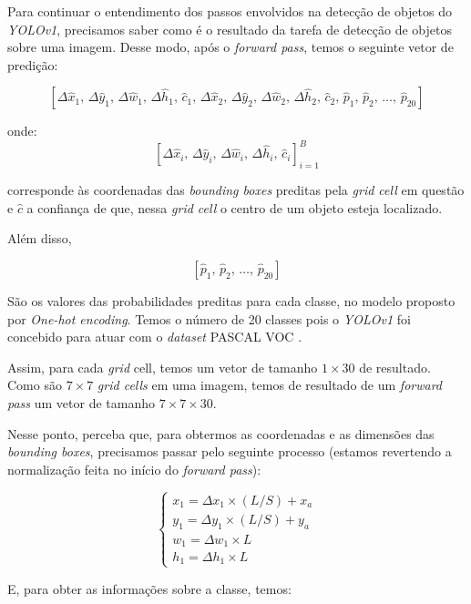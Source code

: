 Para continuar o entendimento dos passos envolvidos na detecção de objetos do \emph{YOLOv1}, precisamos saber como é o resultado da tarefa de detecção de objetos sobre uma imagem. Desse modo, após o \emph{forward pass}, temos o seguinte vetor de predição:

$$
\left[
\Delta\hat{x}_1, \, \Delta\hat{y}_1, \, \Delta \hat{w}_1, \, \Delta\hat{h}_1, \, \hat{c}_1, \, \Delta\hat{x}_2, \, \Delta\hat{y}_2, \, \Delta\hat{w}_2, \, \Delta \hat{h}_2, \, \hat{c}_2, \, \hat{p}_1, \, \hat{p}_2, \, \dots, \, \hat{p}_{20} 
\right]
$$

onde:
$$
\left[
\Delta\hat{x}_i, \, \Delta\hat{y}_i, \, \Delta \hat{w}_i, \, \Delta\hat{h}_i, \, \hat{c}_i
\right]^B_{i=1}
$$

corresponde às coordenadas das \emph{bounding boxes} preditas pela \emph{grid cell} em questão e $\hat{c}$ a confiança de que, nessa \emph{grid cell} o centro de um objeto esteja localizado.

Além disso, 

$$
\left[
\hat{p}_1, \, \hat{p}_2, \, \dots, \, \hat{p}_{20} 
\right]
$$

São os valores das probabilidades preditas para cada classe, no modelo proposto por \emph{One-hot encoding}. Temos o número de 20 classes pois o \emph{YOLOv1} foi concebido para atuar com o \emph{dataset} PASCAL VOC \citep{yolo}.

Assim, para cada \emph{grid} cell, temos um vetor de tamanho $1 \times 30$ de resultado. Como são $7 \times 7$ \emph{grid cells} em uma imagem, temos de resultado de um \emph{forward pass} um vetor de tamanho $7 \times 7 \times 30$.

Nesse ponto, perceba que, para obtermos as coordenadas e as dimensões das \emph{bounding boxes}, precisamos passar pelo seguinte processo (estamos revertendo a normalização feita no início do \emph{forward pass}):

$$
\begin{cases}
x_1 = \Delta x_1 \times \left(L / S \right) + x_a \\
y_1 = \Delta y_1 \times \left(L / S \right) + y_a \\
w_1 = \Delta w_1 \times L \\
h_1 = \Delta h_1 \times L
\end{cases}
$$

E, para obter as informações sobre a classe, temos:

